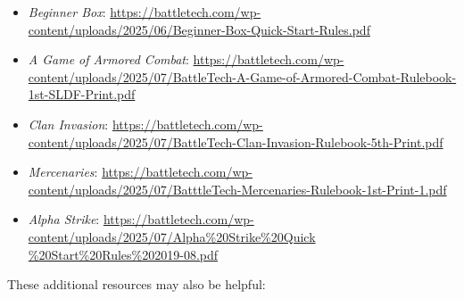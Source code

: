 \begin{itemize}

    \item \emph{Beginner Box}: \href{https://battletech.com/wp-content/uploads/2025/06/Beginner-Box-Quick-Start-Rules.pdf}{https://battletech.com/wp-content/uploads/2025/06/Beginner-Box-Quick-Start-Rules.pdf}

    \item \emph{A Game of Armored Combat}: \href{https://battletech.com/wp-content/uploads/2025/07/BattleTech-A-Game-of-Armored-Combat-Rulebook-1st-SLDF-Print.pdf}{https://battletech.com/wp-content/uploads/2025/07/BattleTech-A-Game-of-Armored-Combat-Rulebook-1st-SLDF-Print.pdf}

    \item \emph{Clan Invasion}: \href{https://battletech.com/wp-content/uploads/2025/07/BattleTech-Clan-Invasion-Rulebook-5th-Print.pdf}{https://battletech.com/wp-content/uploads/2025/07/BattleTech-Clan-Invasion-Rulebook-5th-Print.pdf}

    \item \emph{Mercenaries}: \href{https://battletech.com/wp-content/uploads/2025/07/BatttleTech-Mercenaries-Rulebook-1st-Print-1.pdf}{https://battletech.com/wp-content/uploads/2025/07/BatttleTech-Mercenaries-Rulebook-1st-Print-1.pdf}

    \item \emph{Alpha Strike}: \href{https://battletech.com/wp-content/uploads/2025/07/Alpha\%20Strike\%20Quick\%20Start\%20Rules\%202019-08.pdf}{https://battletech.com/wp-content/uploads/2025/07/Alpha\%20Strike\%20Quick \%20Start\%20Rules\%202019-08.pdf}

\end{itemize}

These additional resources may also be helpful:

